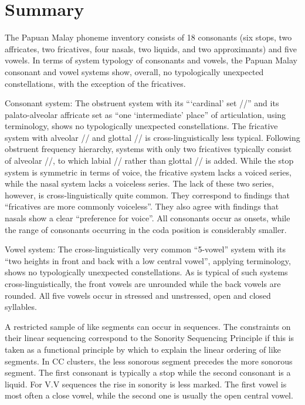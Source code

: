 \section{Summary\label{Para_2.7}}

The Papuan Malay phoneme inventory consists of 18 consonants (six stops, two affricates, two fricatives, four nasals, two liquids, and two approximants) and five vowels. In terms of  system typology of consonants and vowels, the Papuan Malay consonant and vowel systems show, overall, no typologically unexpected constellations, with the exception of the fricatives.



Consonant system: The obstruent system with its “‘cardinal’ set //” and its palato-alveolar affricate set as “one ‘intermediate’ place” of articulation, using  terminology, shows no typologically unexpected constellations. The fricative system with alveolar // and glottal // is cross-linguistically less typical. Following  obstruent frequency hierarchy, systems with only two fricatives typically consist of alveolar //, to which labial // rather than glottal // is added. While the stop system is symmetric in terms of voice, the fricative system lacks a voiced series, while the nasal system lacks a voiceless series. The lack of these two series, however, is cross-linguistically quite common. They correspond to  findings that “fricatives are more commonly voiceless”. They also agree with  findings that nasals show a clear “preference for voice”. All consonants occur as onsets, while the range of consonants occurring in the coda position is considerably smaller.



Vowel system: The cross-linguistically very common “5-vowel” system with its “two heights in front and back with a low central vowel”, applying  terminology, shows no typologically unexpected constellations. As is typical of such systems cross-linguistically, the front vowels are unrounded while the back vowels are rounded. All five vowels occur in stressed and unstressed, open and closed syllables.




A restricted sample of like segments can occur in sequences. The constraints on their linear sequencing correspond to the Sonority Sequencing Principle if this is taken as a functional principle by which to explain the linear ordering of like segments. In CC clusters, the less sonorous segment precedes the more sonorous segment. The first consonant is typically a stop while the second consonant is a liquid. For V.V sequences the rise in sonority is less marked. The first vowel is most often a close vowel, while the second one is usually the open central vowel.



